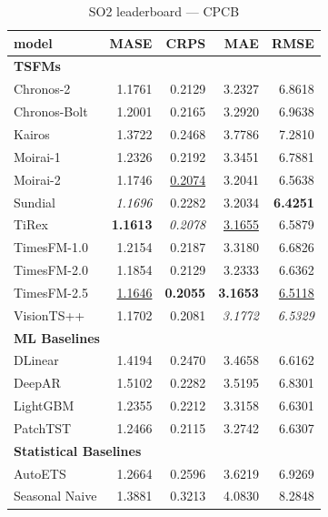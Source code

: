 \begin{table}[H]
\caption{SO2 leaderboard --- CPCB}
\centering
\begin{small}
\begin{tabular}{lrrrr}
\toprule
model & MASE & CRPS & MAE & RMSE \\
\midrule
\multicolumn{5}{l}{\textbf{TSFMs}} \\
Chronos-2 & 1.1761 & 0.2129 & 3.2327 & 6.8618 \\
Chronos-Bolt & 1.2001 & 0.2165 & 3.2920 & 6.9638 \\
Kairos & 1.3722 & 0.2468 & 3.7786 & 7.2810 \\
Moirai-1 & 1.2326 & 0.2192 & 3.3451 & 6.7881 \\
Moirai-2 & 1.1746 & \underline{0.2074} & 3.2041 & 6.5638 \\
Sundial & \textit{1.1696} & 0.2282 & 3.2034 & \textbf{6.4251} \\
TiRex & \textbf{1.1613} & \textit{0.2078} & \underline{3.1655} & 6.5879 \\
TimesFM-1.0 & 1.2154 & 0.2187 & 3.3180 & 6.6826 \\
TimesFM-2.0 & 1.1854 & 0.2129 & 3.2333 & 6.6362 \\
TimesFM-2.5 & \underline{1.1646} & \textbf{0.2055} & \textbf{3.1653} & \underline{6.5118} \\
VisionTS++ & 1.1702 & 0.2081 & \textit{3.1772} & \textit{6.5329} \\
\midrule
\multicolumn{5}{l}{\textbf{ML Baselines}} \\
DLinear & 1.4194 & 0.2470 & 3.4658 & 6.6162 \\
DeepAR & 1.5102 & 0.2282 & 3.5195 & 6.8301 \\
LightGBM & 1.2355 & 0.2212 & 3.3158 & 6.6301 \\
PatchTST & 1.2466 & 0.2115 & 3.2742 & 6.6307 \\
\midrule
\multicolumn{5}{l}{\textbf{Statistical Baselines}} \\
AutoETS & 1.2664 & 0.2596 & 3.6219 & 6.9269 \\
Seasonal Naive & 1.3881 & 0.3213 & 4.0830 & 8.2848 \\
\bottomrule
\end{tabular}
\end{small}
\end{table}